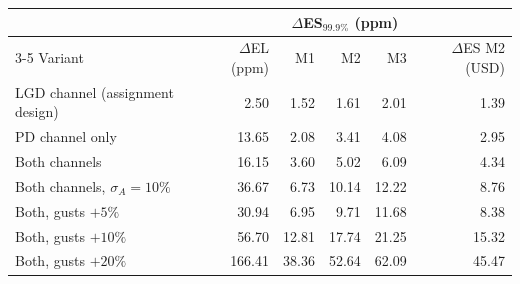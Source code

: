\begin{tabular}{lrrrrr}
\toprule
 & & \multicolumn{3}{c}{$\Delta$ES$_{99.9\%}$ (ppm)} & \\
\cmidrule(lr){3-5}
Variant & $\Delta$EL (ppm) & M1 & M2 & M3 & $\Delta$ES M2 (USD) \\
\midrule
LGD channel (assignment design) & 2.50 & 1.52 & 1.61 & 2.01 & 1.39 \\
PD channel only & 13.65 & 2.08 & 3.41 & 4.08 & 2.95 \\
Both channels & 16.15 & 3.60 & 5.02 & 6.09 & 4.34 \\
Both channels, $\sigma_A=10\%$ & 36.67 & 6.73 & 10.14 & 12.22 & 8.76 \\
\midrule
Both, gusts $+5\%$ & 30.94 & 6.95 & 9.71 & 11.68 & 8.38 \\
Both, gusts $+10\%$ & 56.70 & 12.81 & 17.74 & 21.25 & 15.32 \\
Both, gusts $+20\%$ & 166.41 & 38.36 & 52.64 & 62.09 & 45.47 \\
\bottomrule
\end{tabular}
